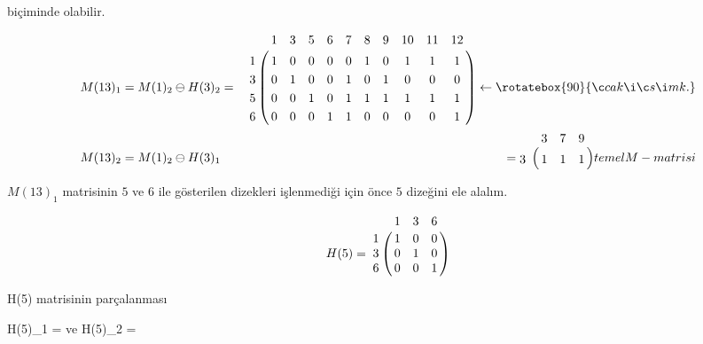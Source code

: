 \documentclass[11pt]{amsbook}
\begin{document}
\chapter{}



biçiminde olabilir.

\begin{align}

     M(13)_{1} &=  M(1)_{2} \ominus H(3)_{2}
     
         =& \bordermatrix{~ & 1 & 3 & 5 & 6 & 7 & 8 & 9 & 10 & 11 & 12\cr
                  1 & 1 & 0 & 0 & 0 & 0 & 1 & 0 & 1 & 1 & 1 \cr
                  3 & 0 & 1 & 0 & 0 & 1 & 0 & 1 & 0 & 0 & 0 \cr
                  5 & 0 & 0 & 1 & 0 & 1 & 1 & 1 & 1 & 1 & 1 \cr
                  6 & 0 & 0 & 0 & 1 & 1 & 0 & 0 & 0 & 0 & 1 \cr }
                  \leftarrow \rotatebox{90}{çakışım k.}\\
                  
                  

M(13)_{2}  &= M(1)_{2} \ominus H(3)_{1}
                
           &= \bordermatrix{~ & 3 & 7 & 9\cr
                            3 & 1 & 1 & 1\cr } 
                                temel M-matrisi
    
\end{align}


   $ M(13)_{1}$ matrisinin $5$ ve $6$ ile gösterilen dizekleri işlenmediği için önce $5$ dizeğini ele alalım.
   
   \begin{center}
   \[
      H(5) = \bordermatrix{~ & 1 & 3 & 6\cr
                           1 & 1 & 0 & 0\cr 
                           3 & 0 & 1 & 0\cr
                           6 & 0 & 0 & 1               }
   \]
   
   \end{center}
   
   H(5) matrisinin parçalanması
  
   H(5)_{1} =  \quad ve \quad
    H(5)_{2} = 
   
   


                                        
                  
\end{document}
